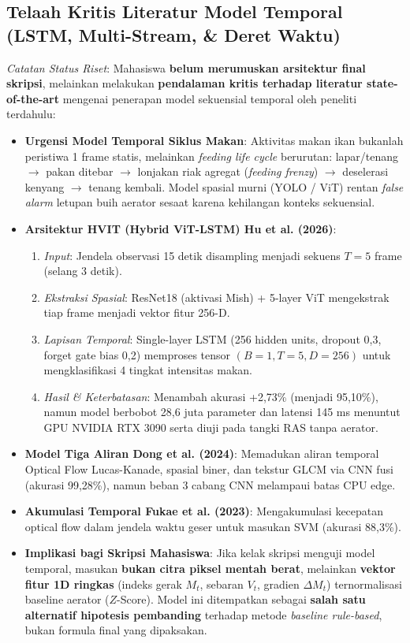 \documentclass[10pt,a4paper]{article}
\begin{document}
\subsection{Telaah Kritis Literatur Model Temporal (LSTM, Multi-Stream, \& Deret Waktu)}
{\small
\textit{Catatan Status Riset}: Mahasiswa \textbf{belum merumuskan arsitektur final skripsi}, melainkan melakukan \textbf{pendalaman kritis terhadap literatur state-of-the-art} mengenai penerapan model sekuensial temporal oleh peneliti terdahulu:
\begin{itemize}[leftmargin=*,itemsep=0.5pt,topsep=1pt,parsep=0pt]
    \item \textbf{Urgensi Model Temporal Siklus Makan}: Aktivitas makan ikan bukanlah peristiwa 1 frame statis, melainkan \textit{feeding life cycle} berurutan: lapar/tenang $\to$ pakan ditebar $\to$ lonjakan riak agregat (\textit{feeding frenzy}) $\to$ deselerasi kenyang $\to$ tenang kembali. Model spasial murni (YOLO / ViT) rentan \textit{false alarm} letupan buih aerator sesaat karena kehilangan konteks sekuensial.
    \item \textbf{Arsitektur HVIT (Hybrid ViT-LSTM) Hu et al. (2026)}:
    \begin{enumerate}[label=(\alph*),itemsep=0pt,topsep=0pt,parsep=0pt]
        \item \textit{Input}: Jendela observasi 15 detik disampling menjadi sekuens $T=5$ frame (selang 3 detik).
        \item \textit{Ekstraksi Spasial}: ResNet18 (aktivasi Mish) + 5-layer ViT mengekstrak tiap frame menjadi vektor fitur 256-D.
        \item \textit{Lapisan Temporal}: Single-layer LSTM (256 hidden units, dropout 0,3, forget gate bias 0,2) memproses tensor $(B=1, T=5, D=256)$ untuk mengklasifikasi 4 tingkat intensitas makan.
        \item \textit{Hasil \& Keterbatasan}: Menambah akurasi +2,73\% (menjadi 95,10\%), namun model berbobot 28,6 juta parameter dan latensi 145 ms menuntut GPU NVIDIA RTX 3090 serta diuji pada tangki RAS tanpa aerator.
    \end{enumerate}
    \item \textbf{Model Tiga Aliran Dong et al. (2024)}: Memadukan aliran temporal Optical Flow Lucas-Kanade, spasial biner, dan tekstur GLCM via CNN fusi (akurasi 99,28\%), namun beban 3 cabang CNN melampaui batas CPU edge.
    \item \textbf{Akumulasi Temporal Fukae et al. (2023)}: Mengakumulasi kecepatan optical flow dalam jendela waktu geser untuk masukan SVM (akurasi 88,3\%).
    \item \textbf{Implikasi bagi Skripsi Mahasiswa}: Jika kelak skripsi menguji model temporal, masukan \textbf{bukan citra piksel mentah berat}, melainkan \textbf{vektor fitur 1D ringkas} (indeks gerak $M_t$, sebaran $V_t$, gradien $\Delta M_t$) ternormalisasi baseline aerator ($Z$-Score). Model ini ditempatkan sebagai \textbf{salah satu alternatif hipotesis pembanding} terhadap metode \textit{baseline rule-based}, bukan formula final yang dipaksakan.
\end{itemize}
}
\end{document}
